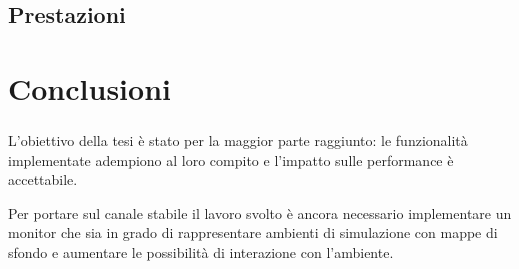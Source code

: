\documentclass[%
]{beamer}
\begin{document}
        \subsection{Prestazioni}\label{subsec:benchmark}
            \begin{frame}
                \frametitle{\insertsection}
                \framesubtitle{\insertsubsection}
                \centering
                
            \end{frame}
    \section{Conclusioni}\label{sec:conclusioni}
        \begin{frame}
            \frametitle{\insertsection}
            L'obiettivo della tesi è stato per la maggior parte raggiunto: le funzionalità implementate adempiono al loro compito e l'impatto sulle performance è accettabile.

            \bigskip

            Per portare sul canale stabile il lavoro svolto è ancora necessario implementare un monitor che sia in grado di rappresentare ambienti di simulazione con mappe di sfondo e aumentare le possibilità di interazione con l'ambiente.
        \end{frame}
\end{document}
